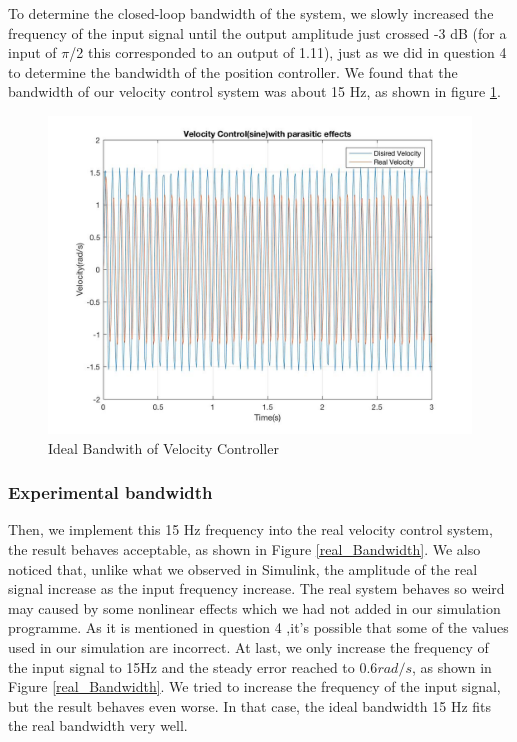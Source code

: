 \documentclass[letterpaper]{article}
\begin{document}
To determine the closed-loop bandwidth of the system, we slowly increased the frequency of the input signal until the output amplitude just crossed -3 dB (for a input of $\pi$/2 this corresponded to an output of 1.11), just as we did in question 4 to determine the bandwidth of the position controller. We found that the bandwidth of our velocity control system was about 15 Hz, as shown in figure \ref{ideal_bandwith}. \\
\begin{figure}[H]
\begin{center}
\includegraphics[width = 12cm]{15hz.jpg}
\caption{Ideal Bandwith of Velocity Controller}
\label{ideal_bandwith}
\end{center}
\end{figure}

\subsubsection*{Experimental bandwidth}
Then, we implement this 15 Hz frequency into the real velocity control system, the result behaves acceptable, as shown in Figure \ref{real_Bandwidth}. We also noticed that, unlike what we observed in Simulink, the amplitude of the real signal increase as the input frequency increase. The real system behaves so weird may caused by some nonlinear effects which we had not added in our simulation programme. As it is mentioned in question 4 ,it's possible that some of the values used in our simulation are incorrect. At last, we only increase the frequency of the input signal to 15Hz and the steady error reached to $0.6 rad/s$, as shown in Figure \ref{real_Bandwidth}. We tried to increase the frequency of the input signal, but the result behaves even worse. In that case, the ideal bandwidth 15 Hz fits the real bandwidth very well.\\
\end{document}

